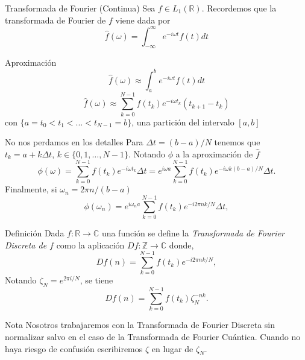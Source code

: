 \documentclass[11pt,compress]{beamer}
\newcommand\C{\mathbb{C}}
\newcommand\R{\mathbb{R}}
\newcommand\Z{\mathbb{Z}}
\begin{document}
\begin{frame}{}
\begin{block}{Transformada de Fourier (Continua)}
Sea $f \in L_1(\R)$. Recordemos que la transformada de Fourier de $f$ viene dada por
\[
\widehat{f} (\omega )=\int _{-\infty }^\infty e^{-i\omega t}f(t) dt
\]
\end{block}
\begin{block}{Aproximación}
\[
\widehat{f} (\omega ) \approx \int _{a}^b e^{-i\omega t}f(t) dt
\]
\[
\widehat{f} (\omega ) \approx \sum _{k=0}^{N-1}f(t_k)e^{-i\omega t_k} (t_{k+1} - t_{k})
\]
con $\{a=t_0<t_1<...<t_{N-1}=b\}$, una partición del intervalo $[a,b]$%
\end{block}
\end{frame}


\begin{frame}

\begin{block}{No nos perdamos en los detalles}
Para $\Delta t =(b-a)/ N$ tenemos que $t_k=a+k\Delta t$, $k \in \{0,1, \ldots, N-1\}$. Notando $\phi$ a la aproximación de $\widehat{f}$
 \[
 \phi(\omega)=\sum_{k=0}^{N-1} f(t_k)e^{-i\omega t_k }\Delta t=e^{i\omega a}\sum_{k=0}^{N-1} f(t_k)e^{-i\omega k (b-a)/N  }\Delta t.
 \]
 Finalmente, si  $\omega_n=2\pi n / (b-a)$
 \[
 \phi(\omega_n)=e^{i\omega_n a}\sum_{k=0}^{N-1}f(t_k)e^{-i2\pi nk/N}\Delta t,
 \]
\end{block}
\end{frame}

\begin{frame}
\begin{block}{Definición}
Dada $f:\R \longrightarrow \C$ una función se define la \emph{Transformada de Fourier Discreta de $f$} como la aplicación $Df:\Z \longrightarrow \C$ donde, 
 \[
 Df(n) = \sum_{k=0}^{N-1}f(t_k)e^{-i2\pi nk/N},
 \]
Notando $\zeta_N=e^{2\pi i/N}$, se tiene
 \[
Df(n) = \sum_{k=0}^{N-1}f(t_k)\zeta_N^{-nk}.
 \]
\end{block}
\begin{block}{Nota}
Nosotros trabajaremos con la Transformada de Fourier Discreta sin normalizar salvo en el caso de la Transformada de Fourier Cuántica. Cuando no haya riesgo de confusión escribiremos $\zeta$ en lugar de $\zeta_N$.
\end{block}
\end{frame}
\end{document}
